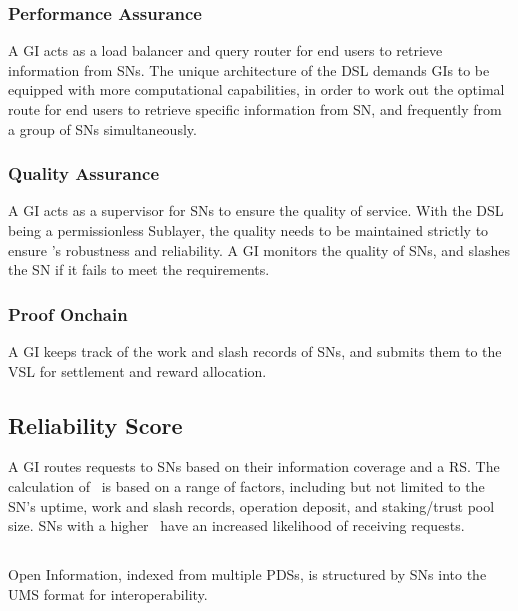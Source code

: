 \subsubsection{Performance Assurance} A GI acts as a load balancer and query router for end users to retrieve information from \glspl{SN}.
The unique architecture of the \gls{DSL} demands \glspl{GI} to be equipped with more computational capabilities, in order to work out the optimal route for end users to retrieve specific information from \gls{SN}, and frequently from a group of \glspl{SN} simultaneously.

\subsubsection{Quality Assurance} A GI acts as a supervisor for \glspl{SN} to ensure the quality of service.
With the \gls{DSL} being a permissionless Sublayer, the quality needs to be maintained strictly to ensure 's robustness and reliability.
A \gls{GI} monitors the quality of \glspl{SN}, and slashes the \gls{SN} if it fails to meet the requirements.

\subsubsection{Proof Onchain} A GI keeps track of the work and slash records of \glspl{SN}, and submits them to the \gls{VSL} for settlement and reward allocation.

\subsection{Reliability Score} 

A \gls{GI} routes requests to \glspl{SN} based on their information coverage and a \gls{RS}.
The calculation of \reliabilityScore\ is based on a range of factors, including but not limited to the \gls{SN}'s uptime, work and slash records, operation deposit, and staking/trust pool size.
\glspl{SN} with a higher \reliabilityScore\ have an increased likelihood of receiving requests.

\subsection{}
\label{subsec:UMS}

Open Information, indexed from multiple \glspl{PDS}, is structured by \glspl{SN} into the \gls{UMS} format for interoperability.

